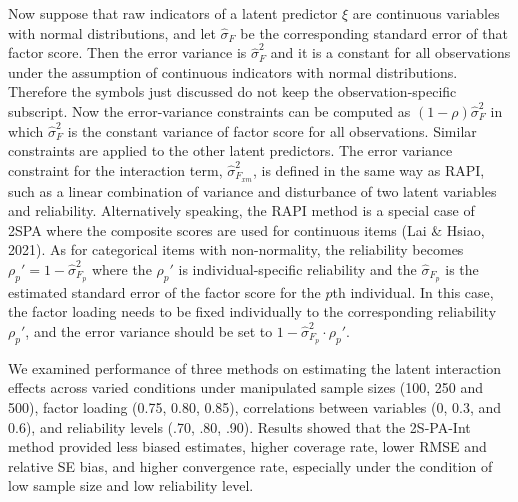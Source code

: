\documentclass[
  man]{apa7}
\begin{document}
Now suppose that raw indicators of a latent predictor \(\xi\) are continuous variables with normal distributions, and let \(\hat{\sigma}_{F}\) be the corresponding standard error of that factor score. Then the error variance is \(\hat{\sigma}_{F}^2\) and it is a constant for all observations under the assumption of continuous indicators with normal distributions. Therefore the symbols just discussed do not keep the observation-specific subscript. Now the error-variance constraints can be computed as \((1 - \rho)\hat{\sigma}_{F}^2\) in which \(\hat{\sigma}_{F}^2\) is the constant variance of factor score for all observations. Similar constraints are applied to the other latent predictors. The error variance constraint for the interaction term, \(\hat{\sigma}_{F_{xm}}^2\), is defined in the same way as RAPI, such as a linear combination of variance and disturbance of two latent variables and reliability. Alternatively speaking, the RAPI method is a special case of 2SPA where the composite scores are used for continuous items (Lai \& Hsiao, 2021). As for categorical items with non-normality, the reliability becomes \(\rho_{p}' = 1 - \widehat{\sigma}_{F_{p}}^2\) where the \(\rho_{p}'\) is individual-specific reliability and the \(\widehat{\sigma}_{F_{p}}\) is the estimated standard error of the factor score for the \(p\)th individual. In this case, the factor loading needs to be fixed individually to the corresponding reliability \(\rho_{p}'\), and the error variance should be set to \(1 - \widehat{\sigma}_{F_{p}}^2 \cdot \rho_{p}'\).

We examined performance of three methods on estimating the latent interaction effects across varied conditions under manipulated sample sizes (100, 250 and 500), factor loading (0.75, 0.80, 0.85), correlations between variables (0, 0.3, and 0.6), and reliability levels (.70, .80, .90). Results showed that the 2S-PA-Int method provided less biased estimates, higher coverage rate, lower RMSE and relative SE bias, and higher convergence rate, especially under the condition of low sample size and low reliability level.
\end{document}

